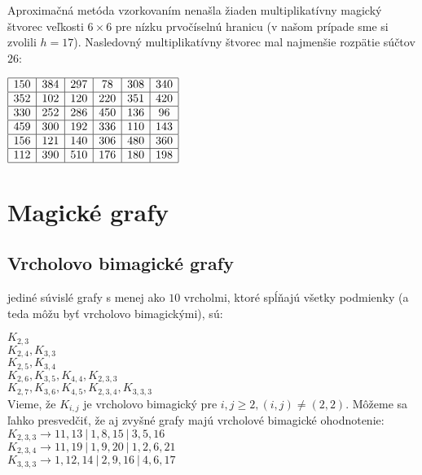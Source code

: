 \begin{subresult} Aproximačná metóda vzorkovaním nenašla žiaden multiplikatívny magický štvorec veľkosti $6 \times 6$ pre nízku prvočíselnú hranicu (v našom prípade sme si zvolili $h = 17$). Nasledovný multiplikatívny štvorec mal najmenšie rozpätie súčtov $26$:
\end{subresult}

\begin{center}
$\begin{array}{ |c|c|c|c|c|c| } 
\hline
150 & 384 & 297 & 78 & 308 & 340 \\ 
\hline
352 & 102 & 120 & 220 & 351 & 420 \\ 
\hline
330 & 252 & 286 & 450 & 136 & 96 \\ 
\hline
459 & 300 & 192 & 336 & 110 & 143 \\ 
\hline
156 & 121 & 140 & 306 & 480 & 360 \\ 
\hline
112 & 390 & 510 & 176 & 180 & 198 \\ 
\hline
\end{array}$
\end{center}


\section{Magické grafy}

\subsection{Vrcholovo bimagické grafy}
 
\begin{subresult} jediné súvislé grafy s menej ako $10$ vrcholmi, ktoré spĺňajú všetky podmienky (a teda môžu byť vrcholovo bimagickými), sú:
\end{subresult}

$K_{2,3}$ \\
$K_{2,4}, K_{3,3}$ \\
$K_{2,5}, K_{3,4}$ \\
$K_{2,6}, K_{3,5}, K_{4,4}, K_{2,3,3}$ \\
$K_{2,7}, K_{3,6}, K_{4,5}, K_{2,3,4}, K_{3,3,3}$ \\


Vieme, že $K_{i,j}$ je vrcholovo bimagický pre $i,j \geq 2, (i,j) \neq (2,2)$. Môžeme sa ľahko presvedčiť, že aj zvyšné grafy majú vrcholové bimagické ohodnotenie: \\
$K_{2,3,3} \rightarrow 11, 13 ~|~ 1, 8, 15 ~|~ 3, 5, 16$ \\
$K_{2,3,4} \rightarrow 11, 19 ~|~ 1, 9, 20 ~|~ 1, 2, 6, 21$ \\
$K_{3,3,3} \rightarrow 1, 12, 14 ~|~ 2, 9, 16 ~|~ 4, 6, 17$


